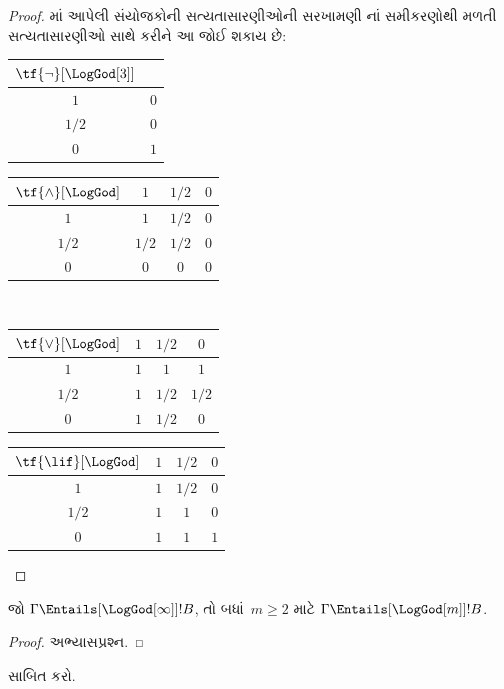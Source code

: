 \documentclass[../../../include/open-logic-section]{subfiles}
\begin{document}
\begin{proof}
  માં આપેલી સંયોજકોની
  સત્યતાસારણીઓની સરખામણી નાં
  સમીકરણોથી મળતી સત્યતાસારણીઓ સાથે કરીને આ જોઈ શકાય છે:
  \begin{center}
    \begin{tabular}{c|c} 
      $\tf{\lnot}[\LogGod[3]]$ & \\ 
      \hline  
      $1$ & $0$ \\ 
      $1/2$ & $0$ \\
      $0$ & $1$ 
    \end{tabular}
    \quad
    \begin{tabular}{c|ccc} 
      $\tf{\land}[\LogGod]$ & $1$ & $1/2$ & $0$ \\ 
      \hline 
      $1$ & $1$ & $1/2$ & $0$ \\ 
      $1/2$ & $1/2$ & $1/2$ & $0$\\ 
      $0$ & $0$ & $0$ & $0$ 
    \end{tabular}
    \\[2ex]
    \begin{tabular}{c|ccc} 
      $\tf{\lor}[\LogGod]$ & $1$ & $1/2$ & $0$ \\ 
      \hline 
      $1$ & $1$ & $1$ & $1$ \\ 
      $1/2$ & $1$ & $1/2$ & $1/2$ \\
      $0$ & $1$ & $1/2$ & $0$ 
    \end{tabular}
    \quad
    \begin{tabular}{c|ccc} 
      $\tf{\lif}[\LogGod]$ & $1$ & $1/2$ & $0$ \\ 
      \hline 
      $1$ & $1$ & $1/2$ & $0$ \\ 
      $1/2$ & $1$ & $1$ & $0$  \\ 
      $0$ & $1$ & $1$ & $1$ 
    \end{tabular}
  \end{center} 
\end{proof}

\begin{prop}
  જો $\Gamma \Entails[\LogGod[\infty]] !B$, તો બધાં~$m \ge 2$
  માટે $\Gamma \Entails[\LogGod[m]] !B$.
\end{prop}

\begin{proof}
  અભ્યાસપ્રશ્ન.
\end{proof}

\begin{prob}
   સાબિત કરો.
\end{prob}
\end{document}
